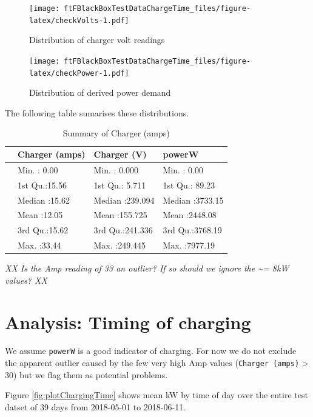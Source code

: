 \documentclass[]{article}
\begin{document}
\begin{figure}
\centering
\texttt{[image: ftFBlackBoxTestDataChargeTime\_files/figure-latex/checkVolts-1.pdf]}
\caption{\label{fig:checkVolts}Distribution of charger volt readings}
\end{figure}

\begin{figure}
\centering
\texttt{[image: ftFBlackBoxTestDataChargeTime\_files/figure-latex/checkPower-1.pdf]}
\caption{\label{fig:checkPower}Distribution of derived power demand}
\end{figure}

The following table sumarises these distributions.

\begin{table}[t]

\caption{\label{tab:summaryTable}Summary of Charger (amps)}
\centering
\begin{tabular}{l|l|l|l}
\hline
  & Charger (amps) &  Charger (V) &     powerW\\
\hline
 & Min.   : 0.00 & Min.   :  0.000 & Min.   :   0.00\\
\hline
 & 1st Qu.:15.56 & 1st Qu.:  5.711 & 1st Qu.:  89.23\\
\hline
 & Median :15.62 & Median :239.094 & Median :3733.15\\
\hline
 & Mean   :12.05 & Mean   :155.725 & Mean   :2448.08\\
\hline
 & 3rd Qu.:15.62 & 3rd Qu.:241.336 & 3rd Qu.:3768.19\\
\hline
 & Max.   :33.44 & Max.   :249.445 & Max.   :7977.19\\
\hline
\end{tabular}
\end{table}

\emph{XX Is the Amp reading of 33 an outlier? If so should we ignore the
\textasciitilde{}= 8kW values? XX}

\section{Analysis: Timing of
charging}\label{analysis-timing-of-charging}

We assume \texttt{powerW} is a good indicator of charging. For now we do
not exclude the apparent outlier caused by the few very high Amp values
(\texttt{Charger\ (amps)} \textgreater{} 30) but we flag them as
potential problems.

Figure \ref{fig:plotChargingTime} shows mean kW by time of day over the
entire test datset of 39 days from 2018-05-01 to 2018-06-11.
\end{document}
